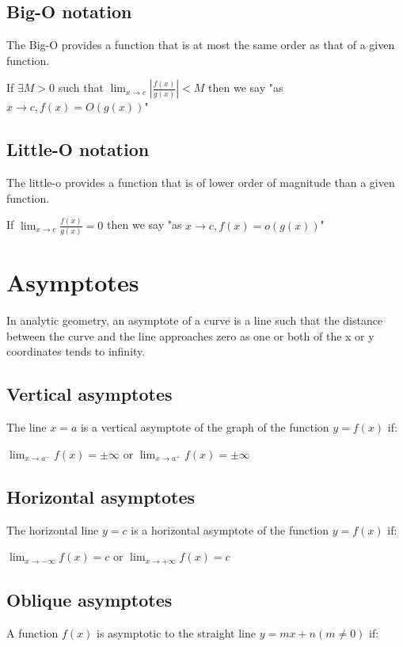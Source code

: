 \subsection{Big-O notation}
The Big-O provides a function that is at most the same order as that of a given function.

If $\exists M>0$ such that $\displaystyle \lim_{x\rightarrow c} \left| \frac{f(x)}{g(x)} \right| < M $ then we say "as $x\rightarrow c, f(x)=O(g(x))$"

\subsection{Little-O notation}
The little-o provides a function that is of lower order of magnitude than a given function.

If $\displaystyle \lim_{x\rightarrow c} \frac{f(x)}{g(x)} = 0 $ then we say "as $x\rightarrow c, f(x)=o(g(x))$"



\section{Asymptotes}
In analytic geometry, an asymptote of a curve is a line such that the distance between the curve and the line approaches zero as one or both of the x or y coordinates tends to infinity.

\subsection{Vertical asymptotes}
The line $x = a$ is a vertical asymptote of the graph of the function $y = f(x)$ if:

 $\displaystyle \lim_{x\rightarrow a^-} f(x) = \pm \infty $ or 
 $\displaystyle \lim_{x\rightarrow a^+} f(x) = \pm \infty $


\subsection{Horizontal asymptotes}
The horizontal line $y = c$ is a horizontal asymptote of the function $y = f(x)$ if:

 $\displaystyle \lim_{x\rightarrow -\infty} f(x) = c $ or 
 $\displaystyle \lim_{x\rightarrow + \infty} f(x) = c $
 
\subsection{Oblique asymptotes}
A function $f(x)$ is asymptotic to the straight line $y = mx + n (m \ne 0)$ if:

